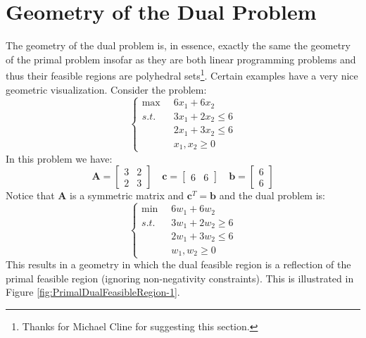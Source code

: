 \section{Geometry of the Dual Problem}
The geometry of the dual problem is, in essence, exactly the same the geometry of the primal problem insofar as they are both linear programming problems and thus their feasible regions are polyhedral sets\footnote{Thanks for Michael Cline for suggesting this section.}. Certain examples have a very nice geometric visualization. Consider the problem:
\begin{equation}
\left\{
\begin{aligned}
\max\;\; & 6x_1 + 6x_2 \\
s.t.\;\; & 3x_1 + 2x_2 \leq 6\\
 & 2x_1 + 3x_2 \leq 6\\
 & x_1, x_2 \geq 0
\end{aligned}\right.
\label{eqn:SymmetricDual}
\end{equation}
In this problem we have:
\begin{displaymath}
\mathbf{A} = \begin{bmatrix}3 & 2\\2 & 3\end{bmatrix}\quad \mathbf{c} = \begin{bmatrix}6 & 6\end{bmatrix} \quad \mathbf{b} = \begin{bmatrix}6\\6\end{bmatrix}
\end{displaymath}
Notice that $\mathbf{A}$ is a symmetric matrix and $\mathbf{c}^T = \mathbf{b}$ and the dual problem is:
\begin{equation}
\left\{
\begin{aligned}
\min \;\; & 6w_1 + 6w_2 \\
s.t.\;\; & 3w_1 + 2w_2 \geq 6\\
 & 2w_1 + 3w_2 \leq 6\\
 & w_1, w_2 \geq 0
\end{aligned}\right.
\label{eqn:SymmetricDual}
\end{equation}
This results in a geometry in which the dual feasible region is a reflection of the primal feasible region (ignoring non-negativity constraints). This is illustrated in Figure \ref{fig:PrimalDualFeasibleRegion-1}.
